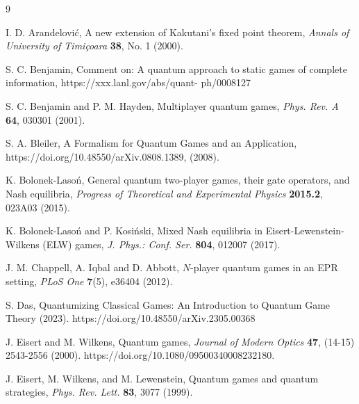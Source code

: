 \documentclass[11pt,a4paper,twoside]{article}
\begin{document}



\begin{thebibliography}{9}


{\textsc I. D. Arandelovi\'c},
A new extension of Kakutani's fixed point theorem,
{\it Annals of University of Timi\c{c}oara} {\bf 38}, No. 1 (2000).

{\textsc S. C. Benjamin}, Comment on: A quantum approach to static games of complete information, https://xxx.lanl.gov/abs/quant-
ph/0008127

{\textsc  S. C. Benjamin and P. M. Hayden}, 
Multiplayer quantum games, {\it Phys. Rev. A} {\bf 64}, 030301 (2001).

{\textsc S. A. Bleiler},
A Formalism for Quantum Games and an Application, \\
https://doi.org/10.48550/arXiv.0808.1389, (2008).

{\textsc K. Bolonek-Laso\'{n}}, General quantum two-player games, their gate operators, and Nash equilibria, {\it Progress of Theoretical and Experimental Physics} {\bf 2015.2}, 023A03 (2015).

{\textsc K. Bolonek-Laso\'{n} and P. Kosi\'{n}ski}, Mixed Nash equilibria in Eisert-Lewenstein-Wilkens (ELW) games, {\it J. Phys.: Conf. Ser.} {\bf 804}, 012007 (2017).

{\textsc J. M. Chappell, A. Iqbal and D. Abbott}, $N$-player quantum games in an EPR setting, {\it  PLoS One} {\bf 7}(5), e36404 (2012).

{\textsc S. Das},
Quantumizing Classical Games: An Introduction to Quantum Game Theory (2023).
https://doi.org/10.48550/arXiv.2305.00368


{\textsc J. Eisert and M. Wilkens},
Quantum games,
{\it Journal of Modern Optics} {\bf 47}, (14-15)  2543-2556 (2000).  https://doi.org/10.1080/09500340008232180.

{\textsc J. Eisert, M. Wilkens, and M. Lewenstein},
Quantum games and quantum strategies,
{\it Phys. Rev. Lett.} {\bf 83}, 3077 (1999).


\end{thebibliography}
\end{document}
